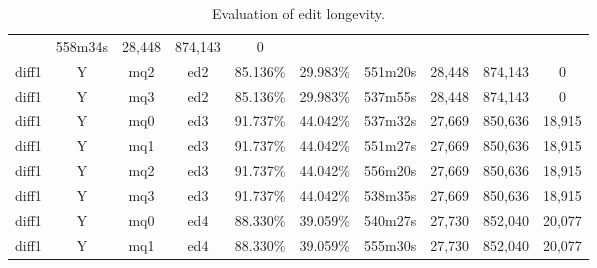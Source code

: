 \begin{sidewaystable}[!tp]
\begin{center}
\begin{tabular}{|c|c|c|c||c|c||c|c|c|c|}
	& 558m34s & 28,448
	& 874,143 & 0 \\
diff1 & Y & mq2 & ed2
	& 85.136\% & 29.983\%
	& 551m20s & 28,448
	& 874,143 & 0 \\
diff1 & Y & mq3 & ed2
	& 85.136\% & 29.983\%
	& 537m55s & 28,448
	& 874,143 & 0 \\
diff1 & Y & mq0 & ed3
	& 91.737\% & 44.042\%
	& 537m32s & 27,669
	& 850,636 & 18,915 \\
diff1 & Y & mq1 & ed3
	& 91.737\% & 44.042\%
	& 551m27s & 27,669
	& 850,636 & 18,915 \\
diff1 & Y & mq2 & ed3
	& 91.737\% & 44.042\%
	& 556m20s & 27,669
	& 850,636 & 18,915 \\
diff1 & Y & mq3 & ed3
	& 91.737\% & 44.042\%
	& 538m35s & 27,669
	& 850,636 & 18,915 \\
diff1 & Y & mq0 & ed4
	& 88.330\% & 39.059\%
	& 540m27s & 27,730
	& 852,040 & 20,077 \\
diff1 & Y & mq1 & ed4
	& 88.330\% & 39.059\%
	& 555m30s & 27,730
	& 852,040 & 20,077 \\
\hline
    \end{tabular}
  \end{center}
  \caption{Evaluation of edit longevity.}
\end{sidewaystable}

